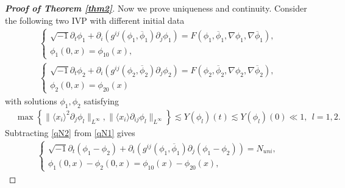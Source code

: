 \documentclass[10pt,twoside,a4paper]{article}
\numberwithin{equation}{section}\allowdisplaybreaks
\begin{document}
\begin{proof}[\textbf{Proof of Theorem \ref{thm2}}]
 		Now we prove uniqueness and continuity. Consider the following two IVP with different initial data
 	\begin{align}	 \label{qN1}
 		\begin{cases}
 			\sqrt{-1}\partial_t \phi_1+\partial_i\left( g^{ij}\left(\phi_1,\overline{\phi}_1\right) \partial_j\phi_1\right)=F\left(\phi_1,\overline{\phi}_1,\nabla\phi_1, \nabla \overline{\phi}_1\right),\\
 			\phi_1(0,x)=\phi_{10}(x),
 		\end{cases}\\
 		\label{qN2}
 		\begin{cases}
 			\sqrt{-1}\partial_t \phi_2+\partial_i\left( g^{ij}\left(\phi_2,\overline{\phi}_2\right) \partial_j\phi_2\right)=F\left(\phi_2,\overline{\phi}_2,\nabla\phi_2, \nabla \overline{\phi}_2\right),\\
 			\phi_2(0,x)=\phi_{20}(x)
 		\end{cases}
 	\end{align}
 	with solutions $ \phi_1, \phi_2 $ satisfying
 	\begin{align} \label{sol1-2}
 		&\max\left\{ \| \langle x_i \rangle^2  \partial_j \phi_l\|_{L^\infty},\| \langle x_i \rangle  \partial_{ij} \phi_l\|_{L^\infty} \right \}\lesssim  Y (\phi_l)(t)\lesssim Y (\phi_l)(0)\ll 1,~~l=1,2.
 	\end{align}
 Subtracting \eqref{qN2} from \eqref{qN1} gives
 	\begin{align} \label{qNLS1-2}
 		\left\{\begin{array}{l}
 			\sqrt{-1}\partial_t (\phi_1-\phi_2)+\partial_i\left( g^{ij}\left(\phi_1,\overline{\phi}_1\right) \partial_j(\phi_1-\phi_2)\right)=  N_{uni},\\
 			\phi_1(0,x)-	\phi_2(0,x)=\phi_{10}(x)-\phi_{20}(x),
 		\end{array}\right.

\end{align}
\end{proof}
\end{document}
